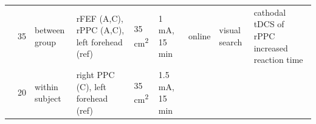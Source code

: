 \documentclass[11pt,]{memoir}
\begin{document}
\begin{longtable}[]{@{}lllllllll@{}}
\begin{minipage}[t]{0.08\columnwidth}\raggedright
\textcite{Ball2013}\strut
\end{minipage} & \begin{minipage}[t]{0.03\columnwidth}\raggedright
35\strut
\end{minipage} & \begin{minipage}[t]{0.05\columnwidth}\raggedright
between
group\strut
\end{minipage} & \begin{minipage}[t]{0.15\columnwidth}\raggedright
rFEF (A,C), rPPC (A,C), left
forehead (ref)\strut
\end{minipage} & \begin{minipage}[t]{0.04\columnwidth}\raggedright
35
cm\textsuperscript{2}\strut
\end{minipage} & \begin{minipage}[t]{0.06\columnwidth}\raggedright
1 mA, 15
min\strut
\end{minipage} & \begin{minipage}[t]{0.05\columnwidth}\raggedright
online\strut
\end{minipage} & \begin{minipage}[t]{0.06\columnwidth}\raggedright
visual
search\strut
\end{minipage} & \begin{minipage}[t]{0.25\columnwidth}\raggedright
cathodal tDCS of rPPC increased reaction time\strut
\end{minipage}\tabularnewline
\begin{minipage}[t]{0.08\columnwidth}\raggedright
\textcite{Ellison2014}\strut
\end{minipage} & \begin{minipage}[t]{0.03\columnwidth}\raggedright
20\strut
\end{minipage} & \begin{minipage}[t]{0.05\columnwidth}\raggedright
within
subject\strut
\end{minipage} & \begin{minipage}[t]{0.15\columnwidth}\raggedright
right PPC (C), left forehead
(ref)\strut
\end{minipage} & \begin{minipage}[t]{0.04\columnwidth}\raggedright
35
cm\textsuperscript{2}\strut
\end{minipage} & \begin{minipage}[t]{0.06\columnwidth}\raggedright
1.5 mA, 15
min\strut
\end{minipage} & \begin{minipage}[t]{0.05\columnwidth}\raggedright

\end{minipage}
\end{longtable}
\end{document}
